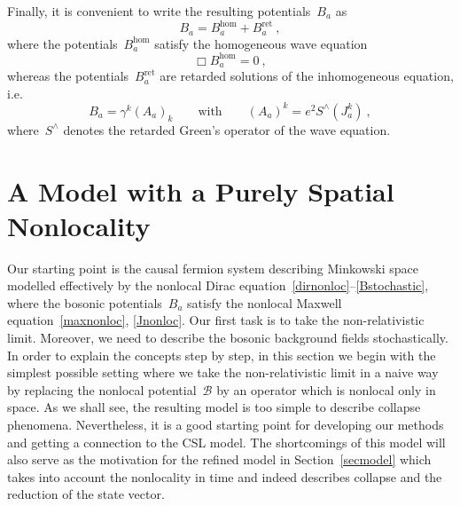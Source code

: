 \documentclass[reqno,11pt]{amsart}
\numberwithin{equation}{section}
\newcommand{\beq}{\begin{equation}}
\newcommand{\eeq}{\end{equation}}
\newcommand{\1}{\mathds{1}}
\newcommand{\B}{{\mathscr{B}}}
\begin{document}
Finally, it is convenient to write the resulting potentials~$B_a$ as
\beq \label{Ahominret}
B_a = B_a^\text{hom} + B_a^\text{ret} \:,
\eeq
where the potentials~$B_a^\text{hom}$ satisfy the homogeneous wave equation
\[ \Box B_a^\text{hom} = 0 \:, \]
whereas the potentials~$B_a^\text{ret}$ are retarded solutions of the inhomogeneous equation, i.e.\
\[ B_a = \gamma^k (A_a)_k \qquad \text{with} \qquad (A_a)^k = e^2 S^\wedge(J_a^k) \:, \]
where~$S^\wedge$ denotes the retarded Green's operator of the wave equation.

\section{A Model with a Purely Spatial Nonlocality} \label{secnonrelativ}
Our starting point is the causal fermion system describing Minkowski space modelled effectively
by the nonlocal Dirac equation~\eqref{dirnonloc}--\eqref{Bstochastic}, where the
bosonic potentials~$B_a$ satisfy the nonlocal Maxwell equation~\eqref{maxnonloc}, \eqref{Jnonloc}.
Our first task is to take the non-relativistic limit. Moreover, we need to describe the
bosonic background fields stochastically.
In order to explain the concepts step by step, in this section we begin
with the simplest possible setting where we take the non-relativistic limit in a naive way by
replacing the nonlocal potential~$\B$ by an operator which is nonlocal only in space.
As we shall see, the resulting model is too simple to describe collapse phenomena.
Nevertheless, it is a good starting point for developing our methods and getting a connection to
the CSL model. The shortcomings of this model will also serve as the motivation for the
refined model in Section~\ref{secmodel} which takes into account the nonlocality in time and
indeed describes collapse and the reduction of the state vector.
\end{document}
